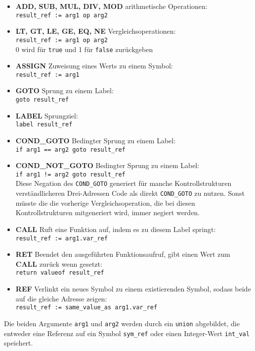 \begin{itemize}
  \item \textbf{ADD, SUB, MUL, DIV, MOD} arithmetische Operationen: \\ \texttt{result\_ref := arg1 op arg2}
  \item \textbf{LT, GT, LE, GE, EQ, NE} Vergleichsoperationen: \\ \texttt{result\_ref := arg1 op arg2}\\ 0 wird für \texttt{true} und 1 für \texttt{false} zurückgeben
  \item \textbf{ASSIGN} Zuweisung eines Werts zu einem Symbol: \\ \texttt{result\_ref := arg1}
  \item \textbf{GOTO} Sprung zu einem Label: \\ \texttt{goto result\_ref}
  \item \textbf{LABEL} Sprungziel: \\ \texttt{label result\_ref}
  \item \textbf{COND\_GOTO} Bedingter Sprung zu einem Label: \\ \texttt{if arg1 == arg2 goto result\_ref}
  \item \textbf{COND\_NOT\_GOTO} Bedingter Sprung zu einem Label:\\ \texttt{if arg1 != arg2 goto result\_ref}\\ 
    Diese Negation des \texttt{COND\_GOTO} generiert für manche Kontrollstrukturen verständlicheren Drei-Adressen Code als direkt \texttt{COND\_GOTO} zu nutzen.
    Sonst müsste die die vorherige Vergleichsoperation, die bei diesen Kontrollstrukturen mitgeneriert wird, immer negiert werden.
  \item \textbf{CALL} Ruft eine Funktion auf, indem es zu diesem Label springt: \\ \texttt{result\_ref := arg1.var\_ref}
  \item \textbf{RET} Beendet den ausgeführten Funktionsaufruf, gibt einen Wert zum \textbf{CALL} zurück wenn gesetzt: \\ \texttt{return valueof result\_ref}
  \item \textbf{REF} Verlinkt ein neues Symbol zu einem existierenden Symbol, sodass beide auf die gleiche Adresse zeigen: \\ \texttt{result\_ref := same\_value\_as arg1.var\_ref}
\end{itemize}

Die beiden Argumente \texttt{arg1} und \texttt{arg2} werden durch ein \texttt{union} abgebildet, die entweder eine Referenz auf ein Symbol \texttt{sym\_ref} oder einen Integer-Wert \texttt{int\_val} speichert.

